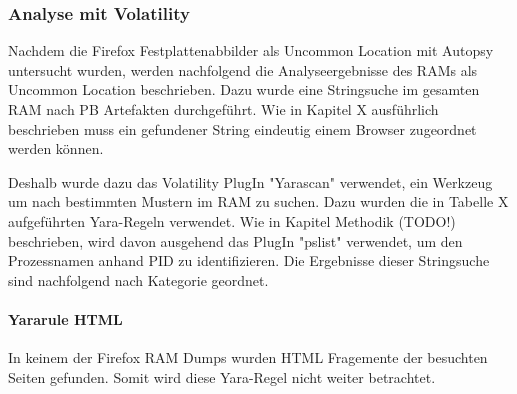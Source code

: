 
\subsubsection*{Analyse mit Volatility}
Nachdem die Firefox Festplattenabbilder als Uncommon Location mit Autopsy untersucht wurden, werden nachfolgend die Analyseergebnisse des RAMs als Uncommon Location beschrieben. 
Dazu wurde eine Stringsuche im gesamten RAM nach PB Artefakten durchgeführt.
Wie in Kapitel X ausführlich beschrieben muss ein gefundener String eindeutig einem Browser zugeordnet werden können. 

Deshalb wurde dazu das Volatility PlugIn "Yarascan" verwendet, ein Werkzeug um nach bestimmten Mustern im RAM zu suchen. Dazu wurden die in Tabelle X aufgeführten Yara-Regeln verwendet.
Wie in Kapitel Methodik (TODO!) beschrieben, wird davon ausgehend das PlugIn "pslist" verwendet, um den Prozessnamen anhand PID zu identifizieren.
Die Ergebnisse dieser Stringsuche sind nachfolgend nach Kategorie geordnet.

\paragraph*{Yararule HTML}
In keinem der Firefox RAM Dumps wurden HTML Fragemente der besuchten Seiten gefunden. Somit wird diese Yara-Regel nicht weiter betrachtet.

